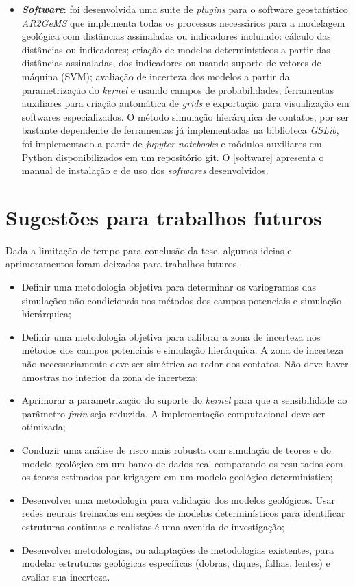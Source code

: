 \begin{itemize}
    \item \textbf{\textit{Software}}: foi desenvolvida uma suite de \textit{plugins} para o software geostatístico \textit{AR2GeMS} que implementa todas os processos necessários para a modelagem geológica com distâncias assinaladas ou indicadores incluindo: cálculo das distâncias ou indicadores; criação de modelos determinísticos a partir das distâncias assinaladas, dos indicadores ou usando suporte de vetores de máquina (SVM); avaliação de incerteza dos modelos a partir da parametrização do \textit{kernel} e usando campos de probabilidades; ferramentas auxiliares para criação automática de \textit{grids} e exportação para visualização em softwares especializados. O método simulação hierárquica de contatos, por ser bastante dependente de ferramentas já implementadas na biblioteca \textit{GSLib}, foi implementado a partir de \textit{jupyter notebooks} e módulos auxiliares em Python disponibilizados em um repositório git. O \autoref{software} apresenta o manual de instalação e de uso dos \textit{softwares} desenvolvidos.
    \end{itemize}

\section{Sugestões para trabalhos futuros}

Dada a limitação de tempo para conclusão da tese, algumas ideias e aprimoramentos foram deixados para trabalhos futuros. 

 \begin{itemize}
    \item Definir uma metodologia objetiva para determinar os variogramas das simulações não condicionais nos métodos dos campos potenciais e simulação hierárquica; 
    \item Definir uma metodologia objetiva para calibrar a zona de incerteza nos métodos dos campos potenciais e simulação hierárquica. A zona de incerteza não necessariamente deve ser simétrica ao redor dos contatos. Não deve haver amostras no interior da zona de incerteza;
    \item Aprimorar a parametrização do suporte do \textit{kernel} para que a sensibilidade ao parâmetro \textit{fmin} seja reduzida. A implementação computacional deve ser otimizada;
    \item Conduzir uma análise de risco mais robusta com simulação de teores e do modelo geológico em um banco de dados real comparando os resultados com os teores estimados por krigagem em um modelo geológico determinístico; 
    \item Desenvolver uma metodologia para validação dos modelos geológicos. Usar redes neurais treinadas em seções de modelos determinísticos para identificar estruturas contínuas e realistas é uma avenida de investigação;
    \item Desenvolver metodologias, ou adaptações de metodologias existentes, para modelar estruturas geológicas específicas (dobras, diques, falhas, lentes) e avaliar sua incerteza.
 \end{itemize}